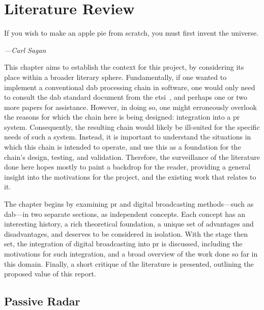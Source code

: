 \documentclass[class=report,11pt,crop=false]{standalone}
\begin{document}
\ifstandalone
\tableofcontents
\fi
\chapter{Literature Review \label{ch:literature}}
\epigraph{If you wish to make an apple pie from scratch, you must first invent the universe.}%
    {\emph{---Carl Sagan}}
This chapter aims to establish the context for this project, by considering its place within a broader literary sphere. Fundamentally, if one wanted to implement a conventional \gls{dab} processing chain in software, one would only need to consult the \gls{dab} standard document from the \gls{etsi}~\cite{dabstandard}, and perhaps one or two more papers for assistance. However, in doing so, one might erroneously overlook the reasons for which the chain here is being designed: integration into a \gls{pr} system. Consequently, the resulting chain would likely be ill-suited for the specific needs of such a system. Instead, it is important to understand the situations in which this chain is intended to operate, and use this as a foundation for the chain's design, testing, and validation. Therefore, the surveillance of the literature done here hopes mostly to paint a backdrop for the reader, providing a general insight into the motivations for the project, and the existing work that relates to it.

The chapter begins by examining \gls{pr} and digital broadcasting methods---such as \gls{dab}---in two separate sections, as independent concepts. Each concept has an interesting history, a rich theoretical foundation, a unique set of advantages and disadvantages, and deserves to be considered in isolation. With the stage then set, the integration of digital broadcasting into \gls{pr} is discussed, including the motivations for such integration, and a broad overview of the work done so far in this domain. Finally, a short critique of the literature is presented, outlining the proposed value of this report.

\section{Passive Radar}
\end{document}
